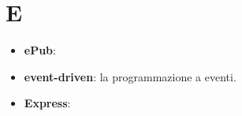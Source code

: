 \section{E}
\begin{itemize} 
	\item \textbf{ePub}:
	\item \textbf{event-driven}: la programmazione a eventi.
	\item \textbf{Express}:
\end{itemize}